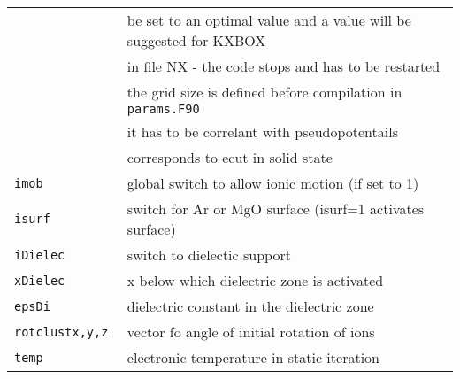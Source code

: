 \documentclass[12pt]{article}
\begin{document}
\begin{tabular}{ll}
&be set to an optimal value and a value will be suggested for KXBOX \\
&in file NX - the code stops and has to be restarted\\
&the grid size is defined before compilation in {\tt params.F90}\\
&it has to be correlant with pseudopotentails\\
&corresponds to ecut in solid state\\
{\tt imob          }& global switch to allow ionic motion (if set to 1) \\
{\tt isurf            }& switch for Ar or MgO surface (isurf=1 activates surface)\\
{\tt iDielec          }& switch to dielectic support\\
{\tt xDielec          }& x below which dielectric zone is activated\\
{\tt epsDi            }& dielectric constant in the dielectric zone\\
{\tt rotclustx,y,z } & vector fo angle of initial rotation of ions\\
{\tt temp} &  electronic temperature in static iteration \\
\hline
\end{tabular}
\end{document}
